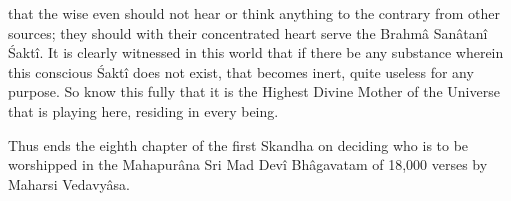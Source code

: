 that the wise even should not hear or think anything to the contrary from other sources; they should with their concentrated heart serve the Brahm\^a San\^atan\^i \'Sakt\^i. It is clearly witnessed in this world that if there be any substance wherein this conscious \'Sakt\^i does not exist, that becomes inert, quite useless for any purpose. So know this fully that it is the Highest Divine Mother of the Universe that is playing here, residing in every being.

Thus ends the eighth chapter of the first Skandha on deciding who is to be worshipped in the Mahapur\^ana Sri Mad Dev\^i Bh\^agavatam of 18,000 verses by Maharsi Vedavy\^asa.